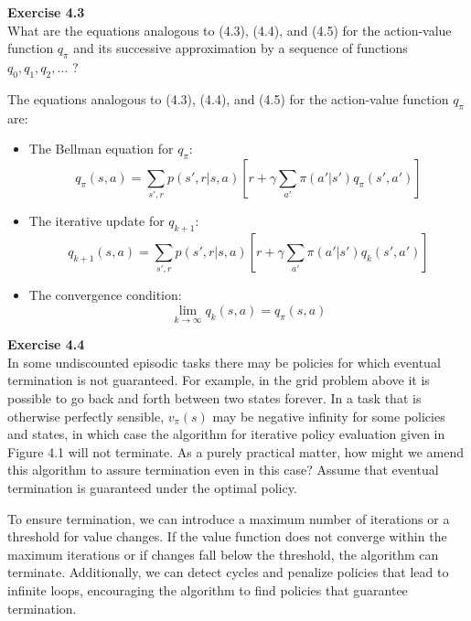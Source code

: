 \documentclass[addpoints]{exam}
\begin{document}
\begin{questions}
    \question
    \textbf{Exercise 4.3} \\ What are the equations analogous to (4.3), (4.4), and (4.5) for the action-value function \(q_{\pi}\) and its successive approximation by a sequence of functions \(q_{0},q_{1},q_{2},\ldots\) ?
    \begin{solution}
        The equations analogous to (4.3), (4.4), and (4.5) for the action-value function \( q_{\pi} \) are:
        \begin{itemize}
            \item The Bellman equation for \( q_{\pi} \):
            \[
            q_{\pi}(s, a) = \sum_{s', r} p(s', r | s, a) \left[ r + \gamma \sum_{a'} \pi(a' | s') q_{\pi}(s', a') \right]
            \]
            \item The iterative update for \( q_{k+1} \):
            \[
            q_{k+1}(s, a) = \sum_{s', r} p(s', r | s, a) \left[ r + \gamma \sum_{a'} \pi(a' | s') q_{k}(s', a') \right]
            \]
            \item The convergence condition:
            \[
            \lim_{k \to \infty} q_{k}(s, a) = q_{\pi}(s, a)
            \]
        \end{itemize}
    \end{solution}

    \question
    \textbf{Exercise 4.4} \\ In some undiscounted episodic tasks there may be policies for which eventual termination is not guaranteed. For example, in the grid problem above it is possible to go back and forth between two states forever. In a task that is otherwise perfectly sensible, \(v_{\pi}(s)\) may be negative infinity for some policies and states, in which case the algorithm for iterative policy evaluation given in Figure 4.1 will not terminate. As a purely practical matter, how might we amend this algorithm to assure termination even in this case? Assume that eventual termination is guaranteed under the optimal policy.
    \begin{solution}
        To ensure termination, we can introduce a maximum number of iterations or a threshold for value changes. If the value function does not converge within the maximum iterations or if changes fall below the threshold, the algorithm can terminate. Additionally, we can detect cycles and penalize policies that lead to infinite loops, encouraging the algorithm to find policies that guarantee termination.
    \end{solution}


\end{questions}
\end{document}
